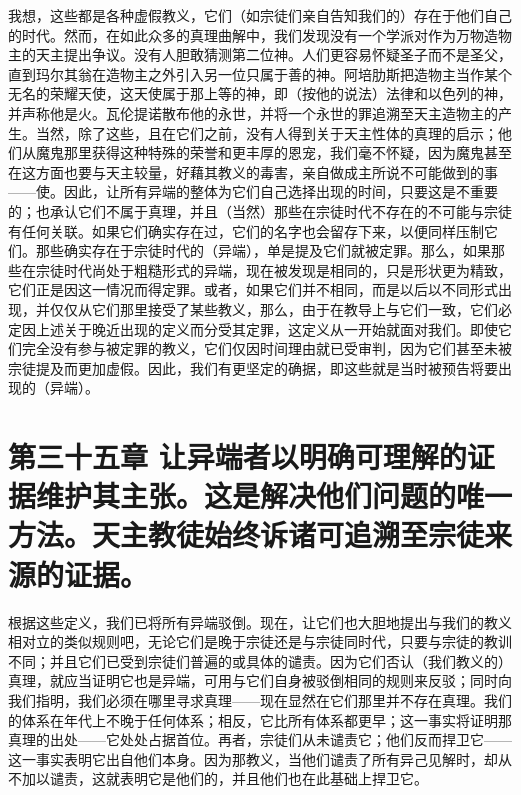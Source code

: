我想，这些都是各种虚假教义，它们（如宗徒们亲自告知我们的）存在于他们自己的时代。然而，在如此众多的真理曲解中，我们发现没有一个学派对作为万物造物主的天主提出争议。没有人胆敢猜测第二位神。人们更容易怀疑圣子而不是圣父，直到玛尔其翁在造物主之外引入另一位只属于善的神。阿培肋斯把造物主当作某个无名的荣耀天使，这天使属于那上等的神，即（按他的说法）法律和以色列的神，并声称他是火。瓦伦提诺散布他的永世，并将一个永世的罪追溯至天主造物主的产生。当然，除了这些，且在它们之前，没有人得到关于天主性体的真理的启示；他们从魔鬼那里获得这种特殊的荣誉和更丰厚的恩宠，我们毫不怀疑，因为魔鬼甚至在这方面也要与天主较量，好藉其教义的毒害，亲自做成主所说不可能做到的事——使。因此，让所有异端的整体为它们自己选择出现的时间，只要这是不重要的；也承认它们不属于真理，并且（当然）那些在宗徒时代不存在的不可能与宗徒有任何关联。如果它们确实存在过，它们的名字也会留存下来，以便同样压制它们。那些确实存在于宗徒时代的（异端），单是提及它们就被定罪。那么，如果那些在宗徒时代尚处于粗糙形式的异端，现在被发现是相同的，只是形状更为精致，它们正是因这一情况而得定罪。或者，如果它们并不相同，而是以后以不同形式出现，并仅仅从它们那里接受了某些教义，那么，由于在教导上与它们一致，它们必定因上述关于晚近出现的定义而分受其定罪，这定义从一开始就面对我们。即使它们完全没有参与被定罪的教义，它们仅因时间理由就已受审判，因为它们甚至未被宗徒提及而更加虚假。因此，我们有更坚定的确据，即这些就是当时被预告将要出现的（异端）。\par


\section{第三十五章 让异端者以明确可理解的证据维护其主张。这是解决他们问题的唯一方法。天主教徒始终诉诸可追溯至宗徒来源的证据。}

根据这些定义，我们已将所有异端驳倒。现在，让它们也大胆地提出与我们的教义相对立的类似规则吧，无论它们是晚于宗徒还是与宗徒同时代，只要与宗徒的教训不同；并且它们已受到宗徒们普遍的或具体的谴责。因为它们否认（我们教义的）真理，就应当证明它也是异端，可用与它们自身被驳倒相同的规则来反驳；同时向我们指明，我们必须在哪里寻求真理——现在显然在它们那里并不存在真理。我们的体系在年代上不晚于任何体系；相反，它比所有体系都更早；这一事实将证明那真理的出处——它处处占据首位。再者，宗徒们从未谴责它；他们反而捍卫它——这一事实表明它出自他们本身。因为那教义，当他们谴责了所有异己见解时，却从不加以谴责，这就表明它是他们的，并且他们也在此基础上捍卫它。\par

